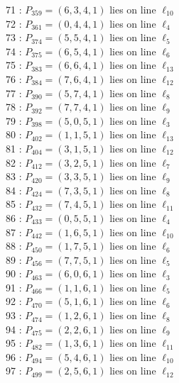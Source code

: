 \documentclass{article}
\begin{document}
{\begin{multicols}{2}
71 : $P_{359}=( 6, 3, 4, 1 )$ lies on line $\ell_{10}$\\
72 : $P_{361}=( 0, 4, 4, 1 )$ lies on line $\ell_{4}$\\
73 : $P_{374}=( 5, 5, 4, 1 )$ lies on line $\ell_{5}$\\
74 : $P_{375}=( 6, 5, 4, 1 )$ lies on line $\ell_{6}$\\
75 : $P_{383}=( 6, 6, 4, 1 )$ lies on line $\ell_{13}$\\
76 : $P_{384}=( 7, 6, 4, 1 )$ lies on line $\ell_{12}$\\
77 : $P_{390}=( 5, 7, 4, 1 )$ lies on line $\ell_{8}$\\
78 : $P_{392}=( 7, 7, 4, 1 )$ lies on line $\ell_{9}$\\
79 : $P_{398}=( 5, 0, 5, 1 )$ lies on line $\ell_{3}$\\
80 : $P_{402}=( 1, 1, 5, 1 )$ lies on line $\ell_{13}$\\
81 : $P_{404}=( 3, 1, 5, 1 )$ lies on line $\ell_{12}$\\
82 : $P_{412}=( 3, 2, 5, 1 )$ lies on line $\ell_{7}$\\
83 : $P_{420}=( 3, 3, 5, 1 )$ lies on line $\ell_{9}$\\
84 : $P_{424}=( 7, 3, 5, 1 )$ lies on line $\ell_{8}$\\
85 : $P_{432}=( 7, 4, 5, 1 )$ lies on line $\ell_{11}$\\
86 : $P_{433}=( 0, 5, 5, 1 )$ lies on line $\ell_{4}$\\
87 : $P_{442}=( 1, 6, 5, 1 )$ lies on line $\ell_{10}$\\
88 : $P_{450}=( 1, 7, 5, 1 )$ lies on line $\ell_{6}$\\
89 : $P_{456}=( 7, 7, 5, 1 )$ lies on line $\ell_{5}$\\
90 : $P_{463}=( 6, 0, 6, 1 )$ lies on line $\ell_{3}$\\
91 : $P_{466}=( 1, 1, 6, 1 )$ lies on line $\ell_{5}$\\
92 : $P_{470}=( 5, 1, 6, 1 )$ lies on line $\ell_{6}$\\
93 : $P_{474}=( 1, 2, 6, 1 )$ lies on line $\ell_{8}$\\
94 : $P_{475}=( 2, 2, 6, 1 )$ lies on line $\ell_{9}$\\
95 : $P_{482}=( 1, 3, 6, 1 )$ lies on line $\ell_{11}$\\
96 : $P_{494}=( 5, 4, 6, 1 )$ lies on line $\ell_{10}$\\
97 : $P_{499}=( 2, 5, 6, 1 )$ lies on line $\ell_{12}$\\

\end{multicols}}
\end{document}
